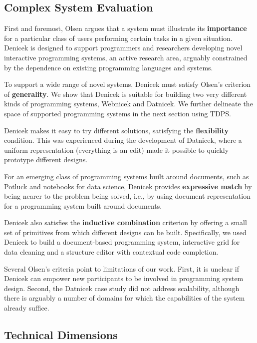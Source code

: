 \documentclass[sigconf]{acmart}
\begin{document}
\subsection{Complex System Evaluation}
First and foremost, Olsen \cite{olsen-2007-evaluation} argues that a system must illustrate
its \textbf{importance} for a particular class of users performing certain tasks in a given situation.
Denicek is designed to support programmers and researchers developing novel interactive programming systems,
an active research area, arguably constrained by the dependence on existing programming languages and systems.

To support a wide range of novel systems, Denicek must satisfy Olsen's criterion of \textbf{generality}.
We show that Denicek is suitable for building two very different kinds of programming systems, Webnicek
and Datnicek. We further delineate the space of supported programming systems in the next section using TDPS.

Denicek makes it easy to try different solutions, satisfying the \textbf{flexibility} condition.
This was experienced during the development of Datnicek, where a uniform representation (everything
is an edit) made it possible to quickly prototype different designs.

For an emerging class of programming systems built around documents, such as Potluck \cite{litt-2020-potluck}
and notebooks for data science, Denicek provides \textbf{expressive match} by being nearer to the
problem being solved, i.e., by using document representation for a programming system built around
documents.

Denicek also satisfies the \textbf{inductive combination}
criterion by offering a small set of primitives from which different designs can be built.
Specifically, we used Denicek to build a document-based programming system, interactive
grid for data cleaning and a structure editor with contextual code completion.

Several Olsen's criteria point to limitations of our work. First, it is unclear if Denicek
can empower new participants to be involved in programming system design. Second, the Datnicek
case study did not address scalability, although there is arguably a number of domains for which
the capabilities of the system already suffice.

\subsection{Technical Dimensions}
\label{sec:eval-tdps}
\end{document}
